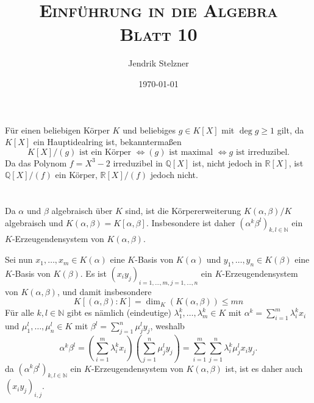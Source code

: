 \documentclass[a4paper,10pt]{article}
\title{\textsc{Einführung in die Algebra \\ \Large Blatt 10}}
\author{Jendrik Stelzner}
\date{\today}
\theoremstyle{definition}
\newcommand{\N}{\mathbb{N}}
\newcommand{\Q}{\mathbb{Q}}
\newcommand{\R}{\mathbb{R}}
\begin{document}
\maketitle





\addtocounter{section}{3}




\section{}
Für einen beliebigen Körper $K$ und beliebiges $g \in K[X]$ mit $\deg g \geq 1$ gilt, da $K[X]$ ein Hauptidealring ist, bekanntermaßen
\[
 K[X]/(g) \text{ ist ein Körper }
 \Leftrightarrow (g) \text{ ist maximal }
 \Leftrightarrow g \text{ ist irreduzibel}.
\]
Da das Polynom $f = X^3 - 2$ irreduzibel in $\Q[X]$ ist, nicht jedoch in $\R[X]$, ist $\Q[X]/(f)$ ein Körper, $\R[X]/(f)$ jedoch nicht.





\section{}


\subsection{}
Da $\alpha$ und $\beta$ algebraisch über $K$ sind, ist die Körpererweiterung $K(\alpha,\beta)/K$ algebraisch und $K(\alpha, \beta) = K[\alpha, \beta]$. Insbesondere ist daher $(\alpha^k \beta^l)_{k,l \in \N}$ ein $K$-Erzeugenden\-system von $K(\alpha,\beta)$.

Sei nun $x_1, \ldots, x_m \in K(\alpha)$ eine $K$-Basis von $K(\alpha)$ und $y_1, \ldots, y_n \in K(\beta)$ eine $K$-Basis von $K(\beta)$. Es ist $(x_i y_j)_{i=1,\ldots,m, j=1,\ldots,n}$ ein $K$-Erzeugendensystem von $K(\alpha,\beta)$, und damit insbesondere
\[
 K[(\alpha,\beta) : K] = \dim_K(K(\alpha,\beta)) \leq mn
\]
Für alle $k,l \in \N$ gibt es nämlich (eindeutige) $\lambda^k_1, \ldots, \lambda^k_m \in K$ mit $\alpha^k = \sum_{i=1}^m \lambda^k_i x_i$ und $\mu^l_1, \ldots, \mu^l_n \in K$ mit $\beta^l = \sum_{j=1}^n \mu^l_j y_j$, weshalb
\[
 \alpha^k \beta^l
 = \left( \sum_{i=1}^m \lambda^k_i x_i \right)\left( \sum_{j=1}^n \mu^l_j y_j \right)
 = \sum_{i=1}^m \sum_{j=1}^n \lambda^k_i \mu^l_j x_i y_j.
\]
da $(\alpha^k \beta^l)_{k,l \in \N}$ ein $K$-Erzeugendensystem von $K(\alpha,\beta)$ ist, ist es daher auch $(x_i y_j)_{i,j}$. 
\end{document}
